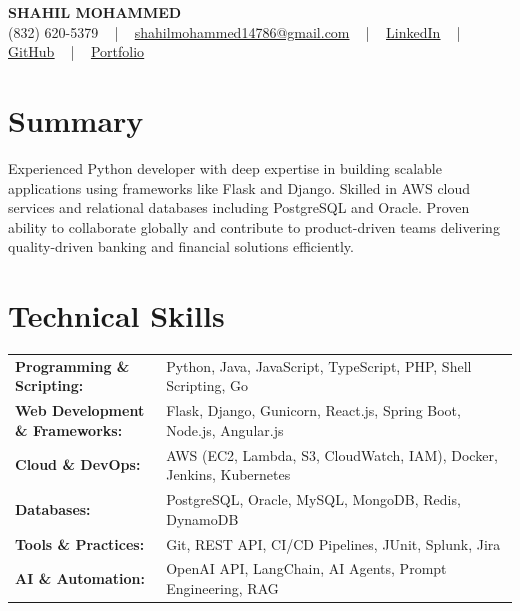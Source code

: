 \documentclass[letterpaper,11pt]{article}
\begin{document}
\begin{center}
    {\fontsize{14pt}{12pt}\selectfont \textbf{\MakeUppercase{Shahil Mohammed}}}\\ \vspace{2pt}
    \fontsize{10pt}{12pt}\selectfont (832) 620-5379 ~ | ~ \href{mailto:shahilmohammed14786@gmail.com}{shahilmohammed14786@gmail.com} ~ | ~  
    \href{https://www.linkedin.com/in/shahil-mohammed-9652931a1/}{\color{blue}\underline{LinkedIn}}  ~ | ~ 
    \href{https://github.com/freakbeast14}{\color{blue}\underline{GitHub}} ~ | ~ 
    \href{https://shahil-mohammed.netlify.app/}{\color{blue}\underline{Portfolio}}
    \vspace{-8pt}
\end{center}

\section{Summary}
\fontsize{9pt}{10pt}\selectfont
Experienced Python developer with deep expertise in building scalable applications using frameworks like Flask and Django. Skilled in AWS cloud services and relational databases including PostgreSQL and Oracle. Proven ability to collaborate globally and contribute to product-driven teams delivering quality-driven banking and financial solutions efficiently.
 \vspace{-5pt}
 
\section{Technical Skills}
        \vspace{-14pt}
        \begin{table}[h]
            \fontsize{9pt}{10pt}\selectfont
            \begin{tabular}{p{0.3\linewidth} p{0.7\linewidth}}
                \textbf{Programming \& Scripting:} & Python, Java, JavaScript, TypeScript, PHP, Shell Scripting, Go \\
                \textbf{Web Development \& Frameworks:} & Flask, Django, Gunicorn, React.js, Spring Boot, Node.js, Angular.js \\
                \textbf{Cloud \& DevOps:} & AWS (EC2, Lambda, S3, CloudWatch, IAM), Docker, Jenkins, Kubernetes \\
                \textbf{Databases:} & PostgreSQL, Oracle, MySQL, MongoDB, Redis, DynamoDB \\
                \textbf{Tools \& Practices:} & Git, REST API, CI/CD Pipelines, JUnit, Splunk, Jira \\
                \textbf{AI \& Automation:} & OpenAI API, LangChain, AI Agents, Prompt Engineering, RAG \\
            \end{tabular}
        \end{table}
 \vspace{-15pt}
 
\end{document}
